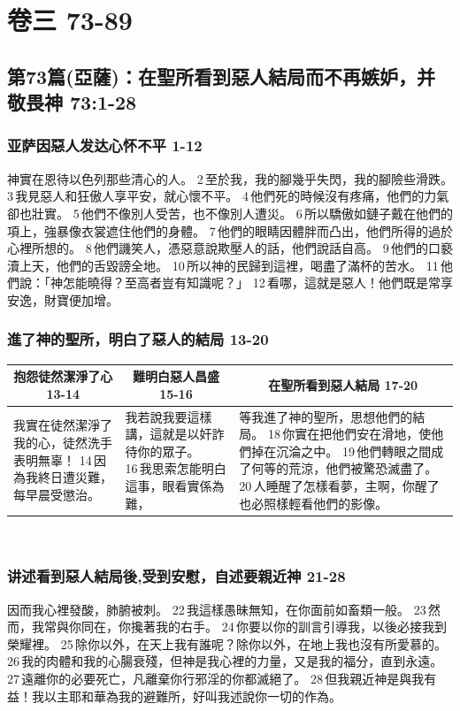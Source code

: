\section{卷三 73-89}
\subsection{第73篇(亞薩)：在聖所看到惡人結局而不再嫉妒，并敬畏神  73:1-28}
\subsubsection{亚萨因惡人发达心怀不平 1-12}
神實在恩待以色列那些清心的人。
2 至於我，我的腳幾乎失閃，我的腳險些滑跌。
3 我見惡人和狂傲人享平安，就心懷不平。
4 他們死的時候沒有疼痛，他們的力氣卻也壯實。
5 他們不像別人受苦，也不像別人遭災。
6 所以驕傲如鏈子戴在他們的項上，強暴像衣裳遮住他們的身體。
7 他們的眼睛因體胖而凸出，他們所得的過於心裡所想的。
8 他們譏笑人，憑惡意說欺壓人的話，他們說話自高。
9 他們的口褻瀆上天，他們的舌毀謗全地。
10 所以神的民歸到這裡，喝盡了滿杯的苦水。
11 他們說：「神怎能曉得？至高者豈有知識呢？」
12 看哪，這就是惡人！他們既是常享安逸，財寶便加增。
\subsubsection{進了神的聖所，明白了惡人的結局 13-20}
\begin{table}[H]
\centering
\begin{tabular}{p{3.75cm}|p{4.00cm}|p{9.00cm}}\hline\hline
\multicolumn{1}{c|}{抱怨徒然潔淨了心13-14}&\multicolumn{1}{c|}{難明白惡人昌盛15-16}&\multicolumn{1}{c}{在聖所看到惡人結局 17-20}\\\hline
我實在徒然潔淨了我的心，徒然洗手表明無辜！
14 因為我終日遭災難，每早晨受懲治。
&我若說我要這樣講，這就是以奸詐待你的眾子。
16 我思索怎能明白這事，眼看實係為難，
&等我進了神的聖所，思想他們的結局。
18 你實在把他們安在滑地，使他們掉在沉淪之中。
19 他們轉眼之間成了何等的荒涼，他們被驚恐滅盡了。
20 人睡醒了怎樣看夢，主啊，你醒了也必照樣輕看他們的影像。\\\hline
\end{tabular}
\end{table} 

\subsubsection{讲述看到惡人結局後,受到安慰，自述要親近神  21-28}
因而我心裡發酸，肺腑被刺。
22 我這樣愚昧無知，在你面前如畜類一般。
23 然而，我常與你同在，你攙著我的右手。
24 你要以你的訓言引導我，以後必接我到榮耀裡。
25 除你以外，在天上我有誰呢？除你以外，在地上我也沒有所愛慕的。
26 我的肉體和我的心腸衰殘，但神是我心裡的力量，又是我的福分，直到永遠。
27 遠離你的必要死亡，凡離棄你行邪淫的你都滅絕了。
28 但我親近神是與我有益！我以主耶和華為我的避難所，好叫我述說你一切的作為。


